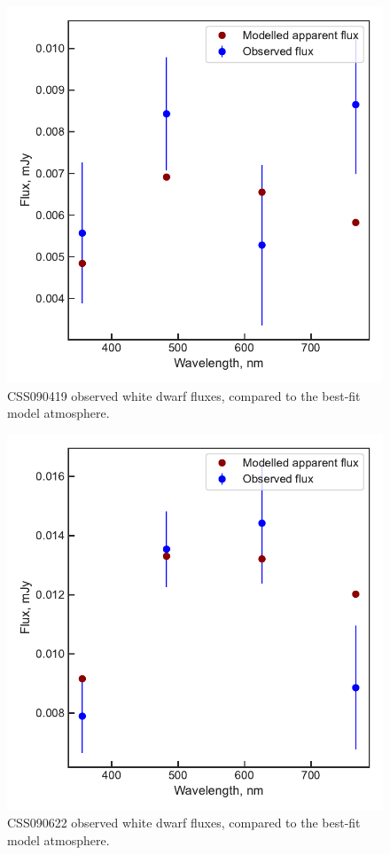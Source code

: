 \begin{figure}
    \centering
    \includegraphics[width=\textwidth]{figures/results/CSS090419/fluxplot.pdf}
    \caption{CSS090419 observed white dwarf fluxes, compared to the best-fit model atmosphere.}
    \label{fig:CSS090419 flux plot}
\end{figure}

\begin{figure}
    \centering
    \includegraphics[width=\textwidth]{figures/results/CSS090622/fluxplot.pdf}
    \caption{CSS090622 observed white dwarf fluxes, compared to the best-fit model atmosphere.}
    \label{fig:CSS090622 flux plot}
\end{figure}

